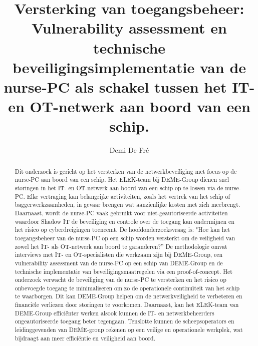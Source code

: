 \documentclass{hogent-article}
\title{Versterking van toegangsbeheer: Vulnerability assessment en technische beveiligingsimplementatie van de nurse-PC als schakel 
tussen het IT- en OT-netwerk aan boord van een schip.}
\author{Demi De Fré}
\begin{document}
\begin{abstract}
  Dit onderzoek is gericht op het versterken van de netwerkbeveiliging met focus op de nurse-PC aan boord van een schip. Het ELEK-team bij DEME-Group 
  dienen snel storingen in het IT- en OT-netwerk aan boord van een schip  op te lossen via de nurse-PC. Elke vertraging kan belangrijke activiteiten, 
  zoals het vertrek van het schip of baggerwerkzaamheden, in gevaar brengen wat aanzienlijke kosten met zich meebrengt. Daarnaast, wordt de nurse-PC vaak 
  gebruikt voor niet-geautoriseerde activiteiten waardoor Shadow IT de beveiliging en controle over de toegang kan ondermijnen en het risico op cyberdreigingen 
  toeneemt. De hoofdonderzoeksvraag is: "Hoe kan het toegangsbeheer van de nurse-PC op een schip worden versterkt om de veiligheid van zowel het IT- als OT-netwerk 
  aan boord te garanderen?” De methodologie omvat interviews met IT- en OT-specialisten die werkzaam zijn bij DEME-Group, een vulnerability assessment van 
  de nurse-PC op een schip van DEME-Group en de technische implementatie van beveiligingsmaatregelen via een proof-of-concept. Het onderzoek verwacht de 
  beveiliging van de nurse-PC te versterken en het risico op onbevoegde toegang te minimaliseren om zo de operationele continuïteit van het schip te waarborgen. 
  Dit kan DEME-Group helpen om de netwerkveiligheid te verbeteren en financiële verliezen door storingen te voorkomen. Daarnaast, kan het ELEK-team van DEME-Group 
  efficiënter werken alsook kunnen de  IT- en netwerkbeheerders ongeautoriseerde toegang beter tegengaan. Tenslotte kunnen de scheepsoperators en leidinggevenden 
  van DEME-group rekenen op een veilige en operationele werkplek, wat bijdraagt aan meer efficiëntie en veiligheid aan boord.
\end{abstract}

\tableofcontents


\printbibliography
\end{document}
